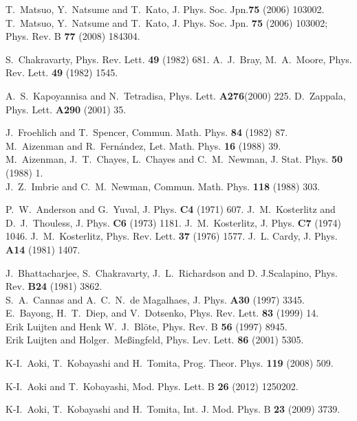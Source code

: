\documentclass[a4paper,preprint,superscriptaddress,preprintnumbers,nofootinbib]{revtex4}
\begin{document}
\begin{thebibliography}{30}
T.~Matsuo, Y.~Natsume and T.~Kato, J. Phys. Soc. Jpn.{\bf 75} (2006) 103002.\\
T.~Matsuo, Y.~Natsume and T.~Kato, J. Phys. Soc. Jpn. {\bf 75} (2006)
103002;
Phys. Rev. B {\bf 77} (2008) 184304.

S.~Chakravarty, Phys. Rev. Lett. {\bf 49} (1982) 681.
A.~J.~Bray, M.~A.~Moore, Phys. Rev. Lett. {\bf 49} (1982) 1545.

A.~S.~Kapoyannisa and N.~Tetradisa, Phys. Lett. {\bf A276}(2000) 225.
D.~Zappala, Phys. Lett. {\bf A290} (2001) 35.

J.~Froehlich and T.~Spencer, Commun. Math. Phys. {\bf 84} (1982) 87.\\
M.~Aizenman and R.~Fern\'andez, Let. Math. Phys. {\bf 16} (1988) 39.\\
M.~Aizenman, J.~T.~Chayes, L.~Chayes and C.~M.~Newman,
J. Stat. Phys. {\bf 50} (1988) 1.\\
J.~Z.~Imbrie and C.~M.~Newman, Commun. Math. Phys. {\bf 118} (1988) 303.

P.~W.~Anderson and G.~Yuval, J. Phys. {\bf C4} (1971) 607.
J.~M.~Kosterlitz and D.~J.~Thouless, J. Phys. {\bf C6} (1973) 1181.
J.~M.~Kosterlitz, J. Phys. {\bf C7} (1974) 1046.
J.~M.~Kosterlitz, Phys. Rev. Lett. {\bf 37} (1976) 1577.
J.~L. Cardy, J. Phys. {\bf A14} (1981) 1407.


J.~Bhattacharjee, S.~Chakravarty, J.~L.~Richardson and D. J.Scalapino,
Phys. Rev. {\bf B24} (1981) 3862.\\
S.~A.~Cannas and A.~C.~N.~de Magalhaes, J. Phys. {\bf A30} (1997) 3345.\\
E.~Bayong, H.~T.~Diep, and V.~Dotsenko, Phys. Rev. Lett. {\bf 83} (1999) 14.\\
Erik Luijten and Henk W.~J.~Bl\"{o}te, Phys. Rev. B {\bf 56} (1997) 8945.\\
Erik Luijten and Holger.~Me\ss ingfeld, Phys. Lev. Lett. {\bf 86} (2001)
5305.

K-I.~Aoki, T.~Kobayashi and H.~Tomita, Prog. Theor. Phys. {\bf 119}
(2008) 509.

K-I.~Aoki and T.~Kobayashi, Mod. Phys. Lett. B {\bf 26}  (2012) 1250202.


K-I.~Aoki, T.~Kobayashi and H.~Tomita, Int. J. Mod. Phys. B {\bf 23}
(2009) 3739.

















\end{thebibliography}
\end{document}

